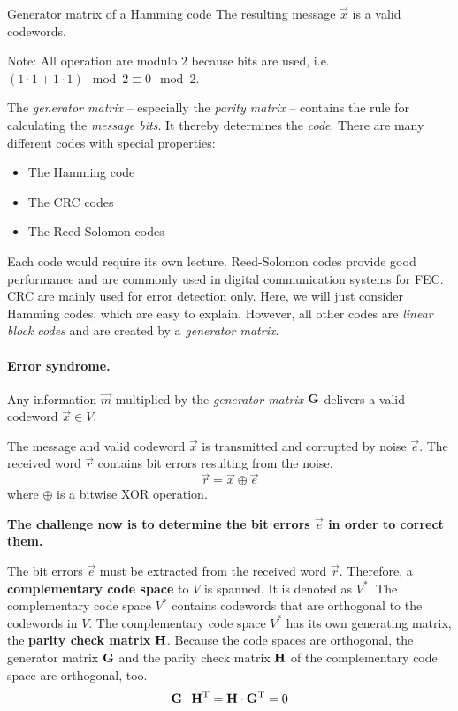 \begin{refsection}
\begin{example}{Generator matrix of a Hamming code}
	The resulting message $\vec{x}$ is a valid codewords.
	
	Note: All operation are modulo $2$ because bits are used, i.e. $(1 \cdot 1 + 1 \cdot 1) \mod 2 \equiv 0 \mod 2$.
\end{example}

The \emph{generator matrix} -- especially the \emph{parity matrix} -- contains the rule for calculating the \emph{message bits}. It thereby determines the \emph{code}. There are many different codes with special properties:
\begin{itemize}
	\item The Hamming code
	\item The \ac{CRC} codes
	\item The Reed-Solomon codes
\end{itemize}
Each code would require its own lecture. Reed-Solomon codes provide good performance and are commonly used in digital communication systems for \ac{FEC}. \ac{CRC} are mainly used for error detection only. Here, we will just consider Hamming codes, which are easy to explain. However, all other codes are \emph{linear block codes} and are created by a \emph{generator matrix}.

\paragraph{Error syndrome.}

Any information $\vec{m}$ multiplied by the \emph{generator matrix} $\bm{\mathrm{G}}$ delivers a valid codeword $\vec{x} \in V$.

The message and valid codeword $\vec{x}$ is transmitted and corrupted by noise $\vec{e}$. The received word $\vec{r}$ contains bit errors resulting from the noise.
\begin{equation}
	\vec{r} = \vec{x} \oplus \vec{e}
\end{equation}
where $\oplus$ is a bitwise \ac{XOR} operation.

\textbf{The challenge now is to determine the bit errors $\vec{e}$ in order to correct them.}

The bit errors $\vec{e}$ must be extracted from the received word $\vec{r}$. Therefore, a  \textbf{complementary code space} to $V$ is spanned. It is denoted as $V^{*}$. The complementary code space $V^{*}$ contains codewords that are orthogonal to the codewords in $V$. The complementary code space $V^{*}$ has its own generating matrix, the  \textbf{parity check matrix} $\bm{\mathrm{H}}$. Because the code spaces are orthogonal, the generator matrix $\bm{\mathrm{G}}$ and the parity check matrix $\bm{\mathrm{H}}$ of the complementary code space are orthogonal, too.
\begin{equation}
	\bm{\mathrm{G}} \cdot \bm{\mathrm{H}}^{\mathrm{T}} = \bm{\mathrm{H}} \cdot \bm{\mathrm{G}}^{\mathrm{T}} = 0
\end{equation}


\end{refsection}
